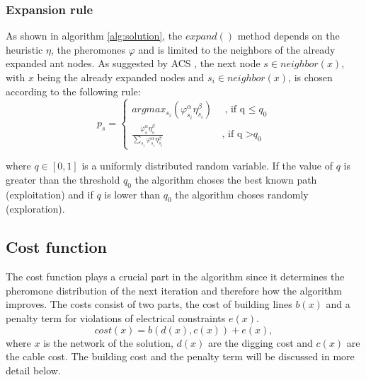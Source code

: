 \subsubsection{Expansion rule}
As shown in algorithm \ref{alg:solution}, the $expand()$ method depends on the heuristic $\eta$, the pheromones $\varphi$ and is limited to the neighbors of the already expanded ant nodes. As suggested by ACS \cite{ant_coloy_system}, the next node $s \in neighbor(x)$, with $x$ being the already expanded nodes and $s_i \in neighbor(x)$, is chosen according to the following rule:
$$p_s = \begin{cases}
	argmax_{s_i}(\varphi_{s_i}^\alpha \eta_{s_i}^\beta) & \, \text{, if q $\leq$} q_0\\
	\frac{\varphi_s^\alpha\eta_s^\beta}{\sum_{s_i}\varphi_{s_i}^\alpha\eta_{s_i}^\beta} & \, \text{, if q >} q_0
\end{cases}$$

where $q \in [0,1]$ is a uniformly distributed random variable. If the value of $q$ is greater than the threshold $q_0$ the algorithm choses the best known path (exploitation) and if $q$ is lower than $q_0$ the algorithm choses randomly (exploration). 

\subsection{Cost function}
The cost function plays a crucial part in the algorithm since it determines the pheromone distribution of the next iteration and therefore how the algorithm improves. The costs consist of two parts, the cost of building lines $b(x)$ and a penalty term for violations of electrical constraints $e(x)$.
$$cost(x) = b(d(x), c(x)) + e(x),$$
where $x$ is the network of the solution, $d(x)$ are the digging cost and $c(x)$ are the cable cost. The building cost and the penalty term will be discussed in more detail below.

